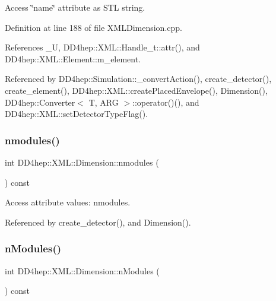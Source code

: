 Access \char`\"{}name\char`\"{} attribute as S\+TL string. 



Definition at line 188 of file X\+M\+L\+Dimension.\+cpp.



References \+\_\+U, D\+D4hep\+::\+X\+M\+L\+::\+Handle\+\_\+t\+::attr(), and D\+D4hep\+::\+X\+M\+L\+::\+Element\+::m\+\_\+element.



Referenced by D\+D4hep\+::\+Simulation\+::\+\_\+convert\+Action(), create\+\_\+detector(), create\+\_\+element(), D\+D4hep\+::\+X\+M\+L\+::create\+Placed\+Envelope(), Dimension(), D\+D4hep\+::\+Converter$<$ T, A\+R\+G $>$\+::operator()(), and D\+D4hep\+::\+X\+M\+L\+::set\+Detector\+Type\+Flag().

\hypertarget{struct_d_d4hep_1_1_x_m_l_1_1_dimension_a174bf93cec66fce9e6a2a08c989a73f4}{}\label{struct_d_d4hep_1_1_x_m_l_1_1_dimension_a174bf93cec66fce9e6a2a08c989a73f4} 
\subsubsection{\texorpdfstring{nmodules()}{nmodules()}}
{\footnotesize\ttfamily int D\+D4hep\+::\+X\+M\+L\+::\+Dimension\+::nmodules (\begin{DoxyParamCaption}{ }\end{DoxyParamCaption}) const}



Access attribute values\+: nmodules. 



Referenced by create\+\_\+detector(), and Dimension().

\hypertarget{struct_d_d4hep_1_1_x_m_l_1_1_dimension_a51d6675dbd056544a2208a42c1032965}{}\label{struct_d_d4hep_1_1_x_m_l_1_1_dimension_a51d6675dbd056544a2208a42c1032965} 
\subsubsection{\texorpdfstring{n\+Modules()}{nModules()}}
{\footnotesize\ttfamily int D\+D4hep\+::\+X\+M\+L\+::\+Dimension\+::n\+Modules (\begin{DoxyParamCaption}{ }\end{DoxyParamCaption}) const}



